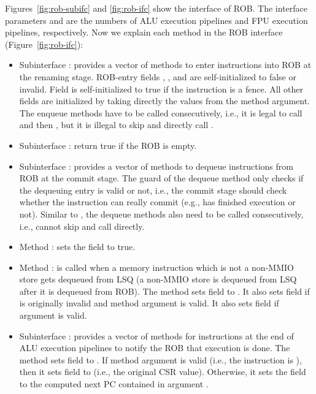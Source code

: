 Figures~\ref{fig:rob-subifc} and \ref{fig:rob-ifc} show the interface of ROB.
The interface parameters  and  are the numbers of ALU execution pipelines and FPU execution pipelines, respectively.
Now we explain each method in the ROB interface (Figure~\ref{fig:rob-ifc}):
\begin{itemize}
    \item Subinterface : provides a vector of methods to enter instructions into ROB at the renaming stage.
    ROB-entry fields , , and  are self-initialized to false or invalid.
    Field  is self-initialized to true if the instruction is a fence.
    All other fields are initialized by taking directly the values from the method argument.
    The enqueue methods have to be called consecutively, i.e., it is legal to call  and then , but it is illegal to skip  and directly call .
    
    \item Subinterface : return true if the ROB is empty.
    
    \item Subinterface : provides a vector of methods to dequeue instructions from ROB at the commit stage.
    The guard of the dequeue method only checks if the dequeuing entry is valid or not, i.e., the commit stage should check whether the instruction can really commit (e.g., has finished execution or not).
    Similar to , the dequeue methods also need to be called consecutively, i.e., cannot skip  and call  directly.
    
    \item Method : sets the  field to true.
    
    \item Method : is called when a memory instruction which is not a non-MMIO store gets dequeued from LSQ (a non-MMIO store is dequeued from LSQ after it is dequeued from ROB).
    The method sets field  to .
    It also sets field  if  is originally invalid and method argument  is valid.
    It also sets field  if argument  is valid.
    
    \item Subinterface : provides a vector of methods for instructions at the end of ALU execution pipelines to notify the ROB that execution is done.
    The method sets field  to .
    If method argument  is valid (i.e., the instruction is ), then it sets field  to  (i.e., the original CSR value).
    Otherwise, it sets the field to the computed next PC contained in argument .
    

\end{itemize}
